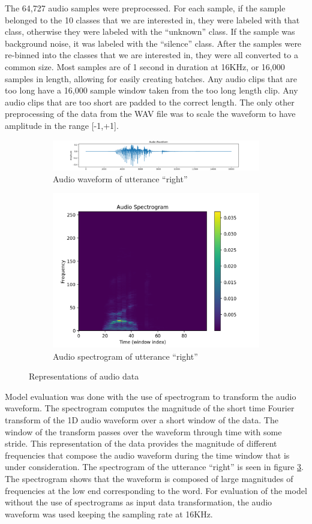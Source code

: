 \documentclass{article}
\begin{document}
The 64,727 audio samples were preprocessed. For each sample, if the
sample belonged to the 10 classes that we are interested in, they were
labeled with that class, otherwise they were labeled with the
``unknown'' class. If the sample was background noise, it was labeled
with the ``silence'' class. After the samples were re-binned into the
classes that we are interested in, they were all converted to a common
size. Most samples are of 1 second in duration at 16KHz, or 16,000
samples in length, allowing for easily creating batches. Any audio clips
that are too long have a 16,000 sample window taken from the too long
length clip. Any audio clips that are too short are padded to the correct
length. The only other preprocessing of the data from the WAV file was
to scale the waveform to have amplitude in the range [-1,+1].
\begin{figure}
  \begin{subfigure}{.5\linewidth}
    \includegraphics[width=\linewidth]{images/waveform-right}
    \caption{Audio waveform of utterance ``right''}
    \label{fig:wave_right}
  \end{subfigure}%
  \begin{subfigure}{.5\linewidth}
    \includegraphics[width=0.75\linewidth]{images/spectrogram-right}
    \caption{Audio spectrogram of utterance ``right''}
    \label{fig:spec_right}
  \end{subfigure}
  \caption{Representations of audio data}
\end{figure}
Model evaluation was done with the use of spectrogram to
transform the audio waveform. The spectrogram computes the magnitude
of the short time Fourier transform of the 1D audio waveform over a
short window of the data. The window of the transform passes over the
waveform through time with some stride. This representation of the
data provides the magnitude of different frequencies that compose the
audio waveform during the time window that is under consideration. The
spectrogram of the utterance ``right'' is seen in figure
\ref{fig:spec_right}. The spectrogram shows that the waveform is
composed of large magnitudes of frequencies at the low end
corresponding to the word. For evaluation of the model without the use
of spectrograms as input data transformation, the audio waveform was
used keeping the sampling rate at 16KHz.
\end{document}

